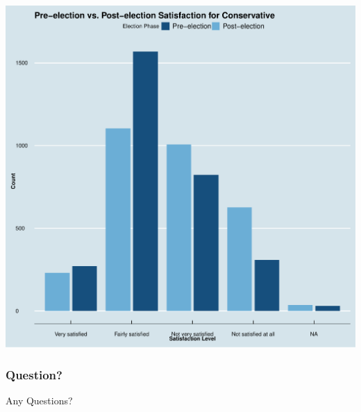 \documentclass{beamer}
\begin{document}
\begin{frame}
\begin{center}
\begin{minipage}{0.48\textwidth}
            \includegraphics[width=\textwidth]{Pre-election vs. Post-election Satisfaction for Conservative.pdf}
        \end{minipage}
    \end{center}
\end{frame}






\begin{frame}
    \frametitle{Question?} %
    \begin{center}
        \vspace{1.5cm} %
        {\Huge Any Questions?} %
        \vspace{1.5cm} %
    \end{center}
\end{frame}
\end{document}

